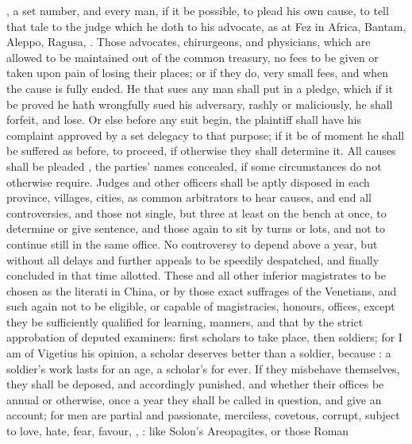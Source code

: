 \etc{}, a set number, and every man, if it be possible, to
plead his own cause, to tell that tale to the judge which he doth to his
advocate, as at Fez in Africa, Bantam, Aleppo, Ragusa, . Those advocates, chirurgeons, and
physicians, which are allowed to be maintained out of the
common treasury, no fees to be given or taken upon pain of
losing their places; or if they do, very small fees, and when the
cause is fully ended. He that sues any
man shall put in a pledge, which if it be proved he hath wrongfully sued his
adversary, rashly or maliciously, he shall forfeit, and lose. Or else before
any suit begin, the plaintiff shall have his complaint approved by a set
delegacy to that purpose; if it be of moment he shall be suffered as before, to
proceed, if otherwise they shall determine it. All causes shall be pleaded
, the parties' names concealed, if some circumstances do
not otherwise require. Judges and other officers shall be aptly disposed in
each province, villages, cities, as common arbitrators to hear causes, and end
all controversies, and those not single, but three at least on the bench at
once, to determine or give sentence, and those again to sit by turns or lots,
and not to continue still in the same office. No controversy to depend above a
year, but without all delays and further appeals to be speedily despatched, and
finally concluded in that time allotted. These and all other inferior
magistrates to be chosen as the literati in China, or by
those exact suffrages of the Venetians, and such again not
to be eligible, or capable of magistracies, honours, offices, except they be
sufficiently qualified for learning, manners, and that by
the strict approbation of deputed examiners: first scholars
to take place, then soldiers; for I am of Vigetius his opinion, a scholar
deserves better than a soldier, because : a soldier's work
lasts for an age, a scholar's for ever. If they misbehave
themselves, they shall be deposed, and accordingly punished, and whether their
offices be annual or otherwise, once a year they shall be
called in question, and give an account; for men are partial and passionate,
merciless, covetous, corrupt, subject to love, hate, fear, favour, \etc{},
: like Solon's Areopagites, or those Roman
